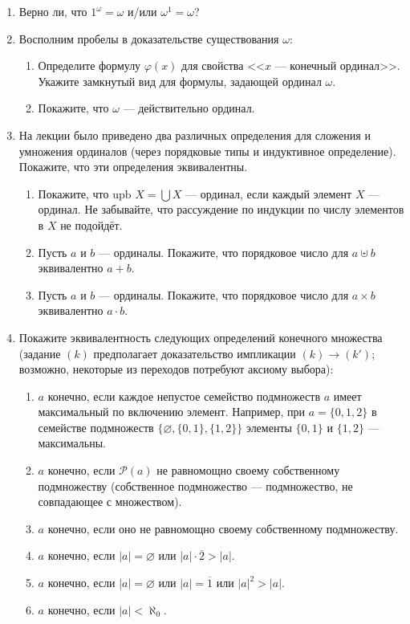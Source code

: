 \documentclass[10pt,a4paper,oneside]{article}
\begin{document}
\begin{enumerate}
\item Верно ли, что $1^\omega = \omega$ и/или $\omega^1 = \omega$?

\item Восполним пробелы в доказательстве существования $\omega$:
\begin{enumerate}
\item Определите формулу $\varphi(x)$ для свойства <<$x$ --- конечный ординал>>. Укажите замкнутый
вид для формулы, задающей ординал $\omega$.
\item Покажите, что $\omega$ --- действительно ординал.
\end{enumerate}

\item На лекции было приведено два различных определения для сложения и умножения ординалов (через порядковые типы и
индуктивное определение). Покажите, что эти определения эквивалентны.
\begin{enumerate}
\item Покажите, что $\text{upb } X = \bigcup X$ --- ординал, если каждый элемент $X$ --- ординал. Не забывайте, что
рассуждение по индукции по числу элементов в $X$ не подойдёт.
\item Пусть $a$ и $b$ --- ординалы. Покажите, что порядковое число для $a \uplus b$ эквивалентно $a + b$.
\item Пусть $a$ и $b$ --- ординалы. Покажите, что порядковое число для $a \times b$ эквивалентно $a \cdot b$.
\end{enumerate}

\item Покажите эквивалентность следующих определений конечного множества (задание $(k)$ предполагает доказательство
импликации $(k)\rightarrow(k')$; возможно, некоторые из переходов потребуют аксиому выбора):
\begin{enumerate}
\item $a$ конечно, если каждое непустое семейство подмножеств $a$ имеет максимальный по включению элемент.
Например, при $a = \{0,1,2\}$ в семействе подмножеств $\{\varnothing,\{0,1\},\{1,2\}\}$ элементы $\{0,1\}$ и $\{1,2\}$ --- максимальны.
\item $a$ конечно, если $\mathcal{P}(a)$ не равномощно своему собственному подмножеству (собственное подмножество --- подмножество, не совпадающее с множеством).
\item $a$ конечно, если оно не равномощно своему собственному подмножеству.
\item $a$ конечно, если $|a|=\varnothing$ или $|a|\cdot\overline{2} > |a|$.
\item $a$ конечно, если $|a|=\varnothing$ или $|a|=\overline{1}$ или $|a|^2 > |a|$.
\item $a$ конечно, если $|a|<\aleph_0$.
\end{enumerate}
\end{enumerate}
\end{document}
